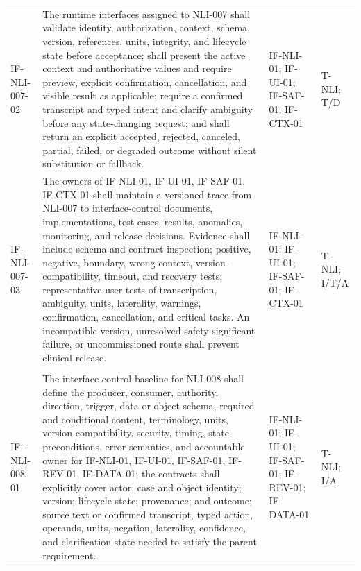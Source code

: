 \documentclass[11pt,letterpaper]{article}
\begin{document}
\begin{scriptsize}
\begin{longtable}{@{}L{0.14\textwidth}L{0.49\textwidth}L{0.19\textwidth}L{0.10\textwidth}@{}}
\addlinespace[2pt]
\mbox{IF-NLI-007-02} & The runtime interfaces assigned to NLI-007 shall validate identity, authorization, context, schema, version, references, units, integrity, and lifecycle state before acceptance; shall present the active context and authoritative values and require preview, explicit confirmation, cancellation, and visible result as applicable; require a confirmed transcript and typed intent and clarify ambiguity before any state-changing request; and shall return an explicit accepted, rejected, canceled, partial, failed, or degraded outcome without silent substitution or fallback. & IF-NLI-01; IF-UI-01; IF-SAF-01; IF-CTX-01 & T-NLI; T\slash\allowbreak{}D \\
\addlinespace[2pt]
\mbox{IF-NLI-007-03} & The owners of IF-NLI-01, IF-UI-01, IF-SAF-01, IF-CTX-01 shall maintain a versioned trace from NLI-007 to interface-control documents, implementations, test cases, results, anomalies, monitoring, and release decisions. Evidence shall include schema and contract inspection; positive, negative, boundary, wrong-context, version-compatibility, timeout, and recovery tests; representative-user tests of transcription, ambiguity, units, laterality, warnings, confirmation, cancellation, and critical tasks. An incompatible version, unresolved safety-significant failure, or uncommissioned route shall prevent clinical release. & IF-NLI-01; IF-UI-01; IF-SAF-01; IF-CTX-01 & T-NLI; I\slash\allowbreak{}T\slash\allowbreak{}A \\
\addlinespace[2pt]
 \\
\addlinespace[2pt]
\mbox{IF-NLI-008-01} & The interface-control baseline for NLI-008 shall define the producer, consumer, authority, direction, trigger, data or object schema, required and conditional content, terminology, units, version compatibility, security, timing, state preconditions, error semantics, and accountable owner for IF-NLI-01, IF-UI-01, IF-SAF-01, IF-REV-01, IF-DATA-01; the contracts shall explicitly cover actor, case and object identity; version; lifecycle state; provenance; and outcome; source text or confirmed transcript, typed action, operands, units, negation, laterality, confidence, and clarification state needed to satisfy the parent requirement. & IF-NLI-01; IF-UI-01; IF-SAF-01; IF-REV-01; IF-DATA-01 & T-NLI; I\slash\allowbreak{}A \\

\end{longtable}
\end{scriptsize}
\end{document}
